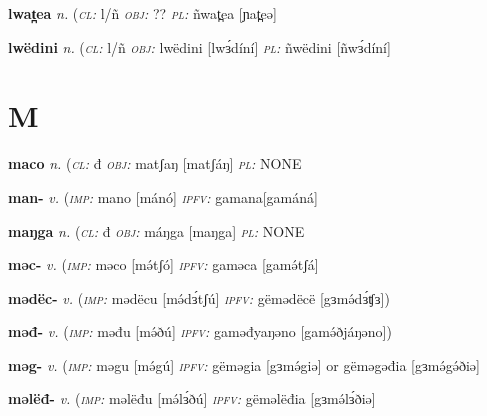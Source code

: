 {\newentry
\headword\textbf{lwat̪ea} 
\ipa{[lwat̪eə]}
\synpos\textit{n.} 
\class(\textit{\textsc{cl:}} {l/ñ}
\object\textit{\textsc{obj:}} ??
\plural\textit{\textsc{pl:}} ñwat̪ea [ɲat̪eə]

\newentry
\headword\textbf{lwëdini} 
\ipa{[lwɜ́díní]}
\synpos\textit{n.} 
\class(\textit{\textsc{cl:}} {l/ñ}
\object\textit{\textsc{obj:}} lwëdini [lwɜ́díní]
\plural\textit{\textsc{pl:}} ñwëdini [ñwɜ́díní]
		
\section*{M}\label{M}

\newentry
\headword\textbf{maco} 
\ipa{[matʃó]}
\synpos\textit{n.} 
\class(\textit{\textsc{cl:}} {đ}
\object\textit{\textsc{obj:}} matʃaŋ [matʃáŋ]
\plural\textit{\textsc{pl:}} NONE

\newentry
\headword\textbf{man-}  
\ipa{[mán-]}
\synpos\textit{v.} 
\imperative(\textit {\textsc{imp:}} mano [mánó]  
\imperfective\textit{\textsc{ipfv:}} gamana[gamáná]

\newentry
\headword\textbf{maŋga} 
\ipa{[máŋga]}
\synpos\textit{n.} 
\class(\textit{\textsc{cl:}} {đ}
\object\textit{\textsc{obj:}} máŋga [maŋga]
\plural\textit{\textsc{pl:}} NONE


\newentry
\headword\textbf{məc-}  
\ipa{[mə́c-]}
\synpos\textit{v.} 
\imperative(\textit {\textsc{imp:}} məco [mə́tʃó] \imperfective\textit{\textsc{ipfv:}} gaməca [gamə́tʃá]

\newentry
\headword\textbf{mədëc-}  
\ipa{[mə́dɜ́tʃ-]}
\synpos\textit{v.} 
\imperative(\textit {\textsc{imp:}} mədëcu [mə́dɜ́tʃú] \imperfective\textit{\textsc{ipfv:}} gëmədëcë [gɜmə́dɜ́ʧɜ])

\newentry
\headword\textbf{məđ-}  
\ipa{[mɘ́ð-]}
\synpos\textit{v.} 
\imperative(\textit {\textsc{imp:}} məđu [mə́ðú] \imperfective\textit{\textsc{ipfv:}} gaməđyaŋəno [gamə́ðjáŋəno]) %

\newentry
\headword\textbf{məg-}  
\ipa{[mɘ́g-]}
\synpos\textit{v.} 
\imperative(\textit {\textsc{imp:}} məgu [mə́gú] \imperfective\textit{\textsc{ipfv:}} gëməgia [gɜmə́giə] or gëməgəđia [gɜmə́gə́ðiə]

\newentry
\headword\textbf{məlëđ-}  
\ipa{[mə́lɜ́ð-]}
\synpos\textit{v.} 
\imperative(\textit {\textsc{imp:}} məlëđu [mə́lɜ́ðú] \imperfective\textit{\textsc{ipfv:}} gëməlëđia [gɜmə́lɜ́ðiə]

}
